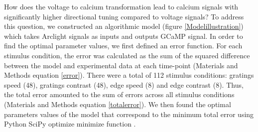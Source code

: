 \documentclass[9pt,lineno]{elife}
\begin{document}
How does the voltage to calcium transformation lead to calcium signals with significantly higher directional tuning compared to voltage signals? To address this question, we constructed an algorithmic model (figure \ref{Modelillustration}) which takes Arclight signals as inputs and outputs GCaMP signal. In order to find the optimal parameter values, we first defined an error function. For each stimulus condition, the error was calculated as the sum of the squared difference between the model and experimental data at each time-point (Materials and Methods equation \eqref{error}). There were a total of 112 stimulus conditions: gratings speed (48), gratings contrast (48), edge speed (8) and edge contrast (8). Thus, the total error amounted to the sum of errors across all stimulus conditions (Materials and Methods equation \eqref{totalerror}). We then found the optimal parameters values of the model that correspond to the minimum total error using Python SciPy optimize minimize function \parencite{Virtanen2020}.
\end{document}
